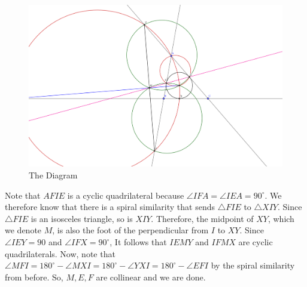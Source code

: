 \documentclass[10pt]{../usamts}
\begin{document}
\begin{solution}
\begin{figure}
\includegraphics[width=12cm]{round2/p4diagram.png}
\caption{The Diagram}
\end{figure}

Note that $AFIE$ is a cyclic quadrilateral because $\angle IFA = \angle IEA = 90^\circ$. We therefore know that there is a spiral similarity that sends $\triangle FIE$ to $\triangle XIY$. Since $\triangle FIE$ is an isosceles triangle, so is $XIY$. Therefore, the midpoint of $XY$, which we denote $M$, is also the foot of the perpendicular from $I$ to $XY$. Since $\angle IEY = 90$ and $\angle IFX = 90^\circ$, It follows that $IEMY$ and $IFMX$ are cyclic quadrilaterals. Now, note that $\angle MFI = 180^\circ - \angle MXI = 180^\circ - \angle YXI = 180^\circ - \angle EFI$ by the spiral similarity from before. So, $M,E,F$ are collinear and we are done.
\end{solution}
\end{document}
